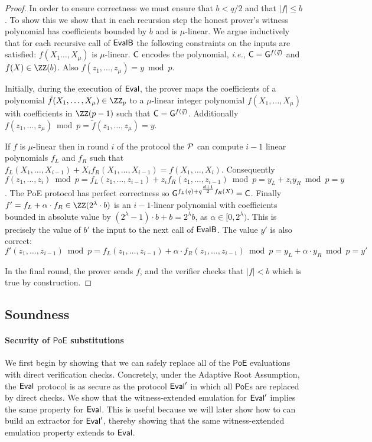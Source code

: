 \begin{proof}
In order to ensure correctness we must ensure that $b< q/2$ and that $|f|\leq b$. To show this we show that in each recursion step the honest prover's witness polynomial has coefficients bounded by $b$ and is $\mu$-linear. 
We argue inductively that for each recursive call of $\textsf{{EvalB}}$ the following constraints on the inputs are satisfied: $f(X_1\dots,X_\mu)$ is $\mu$-linear. $\gr{C}$ encodes the polynomial, \emph{i.e.}, $\gr{C}=\gr{g}^{f(\vec{q})}$ and $f(X)\in \ZZ(b)$. Also $f(z_1,\dots,z_\mu) = y\bmod p$.

Initially, during the execution of $\textsf{{Eval}}$, the prover maps the coefficients of a polynomial $\tilde{f}(X_1,\dots,X_\mu)\in \ZZ_p$ to a $\mu$-linear integer polynomial $f(X_1,\dots,X_\mu)$ with coefficients in $\ZZ(p-1)$  such that $\gr{C}=\gr{g}^{f(\vec{q})}$. Additionally $f(z_1,\dots,z_\mu)\bmod p=\tilde{f}(z_1, \dots,z_\mu)=y$.

 
If $f$ is $\mu$-linear then in round $i$ of the protocol the $\mathcal{P}$ can compute $i-1$ linear polynomials $f_L$ and $f_R$ such that $f_L(X_1,\dots,X_{i-1})+X_i f_R(X_1,\dots,X_{i-1})=f(X_1,\dots,X_i)$. Consequently $f(z_1,\dots,z_{i}) \bmod p=f_L(z_1,\dots,z_{i-1})+ z_i f_R(z_1,\dots,z_{i-1})\bmod p=y_L+z_i  y_R\bmod p =y$. The \textsf{PoE} protocol has perfect correctness so {$\gr{g}^{f_L(q)+q^{\frac{d+1}{2}} f_R(X)}=\gr{C}$}.
 Finally $f'= f_L +\alpha\cdot  f_R \in \ZZ(2^{\lambda} \cdot b)$ is an $i-1$-linear polynomial with coefficients bounded in absolute value by $(2^\lambda-1) \cdot b+b=2^{\lambda} b$, as $\alpha\in [0,2^\lambda)$. This is precisely the value of $b'$ the input to the next call of $\textsf{{EvalB}}$. The value $y'$ is also correct:
$f'(z_1,\dots,z_{i-1})\bmod p=f_L(z_1,\dots,z_{i-1}) +\alpha  \cdot f_R(z_1,\dots,z_{i-1}) \bmod p= y_L +\alpha  \cdot y_R\bmod p=y'$
 
 In the final round, the prover sends $f$, and the verifier checks that $|f|<b$ which is true by construction.
\end{proof} 

\subsection{Soundness}
\label{sec:darksoundness}


\paragraph{Security of $\textsf{PoE}$ substitutions}
We first begin by showing that we can safely replace all of the $\textsf{PoE}$ evaluations with direct verification checks. Concretely, under the Adaptive Root Assumption, the $\textsf{{Eval}}$ protocol is as secure as the protocol $\textsf{{Eval}}'$ in which all $\textsf{PoE}$s are replaced by direct checks. We show that the witness-extended emulation for $\textsf{{Eval}}'$ implies the same property for $\textsf{{Eval}}$. This is useful because we will later show how to can build an extractor for $\textsf{{Eval}}'$, thereby showing that the same witness-extended emulation property extends to $\textsf{{Eval}}$.

